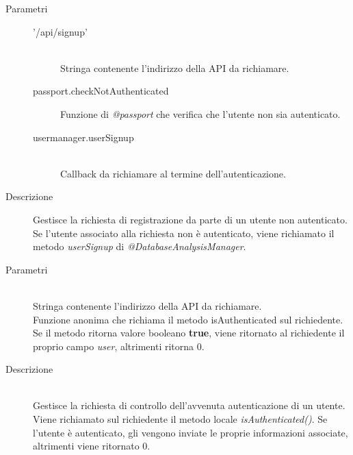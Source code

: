 \begin{description}
\begin{description}
\begin{mldescription}
 \begin{description}
    \item[Parametri] \hfill
     \begin{description}
      \item['/api/signup'] \hfill \\
      Stringa contenente l'indirizzo della API da richiamare.
      \item[passport.checkNotAuthenticated]
      Funzione di \textit{@passport} che verifica che l'utente non sia autenticato.
      \item[usermanager.userSignup] \hfill \\
      Callback da richiamare al termine dell'autenticazione.
     \end{description}
    \item[Descrizione]
    Gestisce la richiesta di registrazione da parte di un utente non autenticato. Se l'utente associato alla richiesta non è autenticato, viene richiamato il metodo \textit{userSignup} di \textit{@DatabaseAnalysisManager}.
 \end{description}
 
 \begin{description}
  \item[Parametri]
   \begin{mldescription}
     \hfill \\
    Stringa contenente l'indirizzo della API da richiamare.
     \hfill \\
    Funzione anonima che richiama il metodo isAuthenticated sul richiedente. Se il metodo ritorna valore booleano \textbf{true}, viene ritornato al richiedente il proprio campo \textit{user}, altrimenti ritorna 0.
   \end{mldescription}
  \item[Descrizione] \hfill \\
 Gestisce la richiesta di controllo dell'avvenuta autenticazione di un utente. Viene richiamato sul richiedente il metodo locale \textit{isAuthenticated()}. Se l'utente è autenticato, gli vengono inviate le proprie informazioni associate, altrimenti viene ritornato 0.
 \end{description}
 

\end{mldescription}
\end{description}
\end{description}
